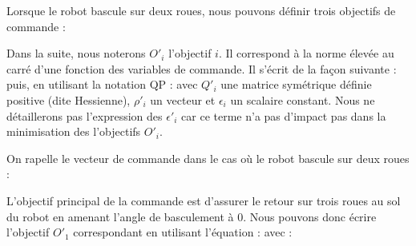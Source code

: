 				Lorsque le robot bascule sur deux roues, nous pouvons définir trois objectifs de commande :
				
				Dans la suite, nous noterons $O'_i$ l'objectif $i$. Il correspond à la norme élevée au carré d'une fonction des variables de commande. Il s'écrit de la façon suivante :
				puis, en utilisant la notation QP :
				avec $Q'_i$ une matrice symétrique définie positive (dite Hessienne), $\rho'_i$ un vecteur et $\epsilon_i$ un scalaire constant.
				Nous ne détaillerons pas l'expression des $\epsilon'_i$ car ce terme n'a pas d'impact pas dans la minimisation des l'objectifs $O'_i$.
				
				On rapelle le vecteur de commande dans le cas où le robot bascule sur deux roues :
				
				
					L'objectif principal de la commande est d'assurer le retour sur trois roues au sol du robot en amenant l'angle de basculement à $0$.
					Nous pouvons donc écrire l'objectif $O'_1$ correspondant en utilisant l'équation  :
					avec :
				
